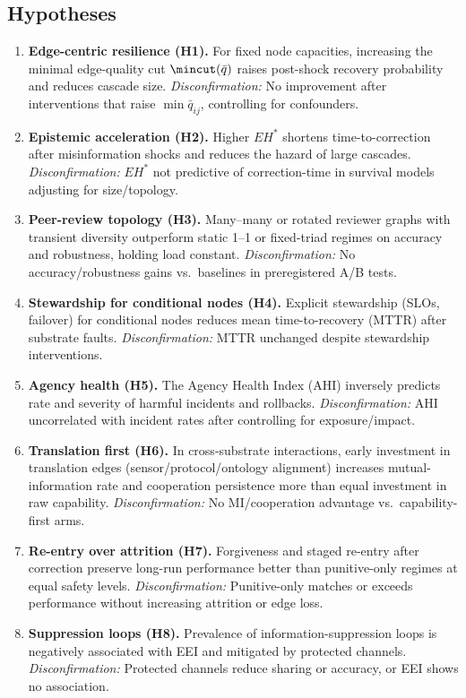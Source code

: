 \documentclass[12pt]{article}
\begin{document}
\subsection{Hypotheses}
\begin{enumerate}[leftmargin=1.2em]
\item \textbf{Edge-centric resilience (H1).} For fixed node capacities, increasing the minimal edge-quality cut $\mincut(\bar{q})$ raises post-shock recovery probability and reduces cascade size. \emph{Disconfirmation:} No improvement after interventions that raise $\min\bar{q}_{ij}$, controlling for confounders.
\item \textbf{Epistemic acceleration (H2).} Higher $EH^{\ast}$ shortens time-to-correction after misinformation shocks and reduces the hazard of large cascades. \emph{Disconfirmation:} $EH^{\ast}$ not predictive of correction-time in survival models adjusting for size/topology.
\item \textbf{Peer-review topology (H3).} Many--many or rotated reviewer graphs with transient diversity outperform static 1--1 or fixed-triad regimes on accuracy and robustness, holding load constant. \emph{Disconfirmation:} No accuracy/robustness gains vs.\ baselines in preregistered A/B tests.
\item \textbf{Stewardship for conditional nodes (H4).} Explicit stewardship (SLOs, failover) for conditional nodes reduces mean time-to-recovery (MTTR) after substrate faults. \emph{Disconfirmation:} MTTR unchanged despite stewardship interventions.
\item \textbf{Agency health (H5).} The Agency Health Index (AHI) inversely predicts rate and severity of harmful incidents and rollbacks. \emph{Disconfirmation:} AHI uncorrelated with incident rates after controlling for exposure/impact.
\item \textbf{Translation first (H6).} In cross-substrate interactions, early investment in translation edges (sensor/protocol/ontology alignment) increases mutual-information rate and cooperation persistence more than equal investment in raw capability. \emph{Disconfirmation:} No MI/cooperation advantage vs.\ capability-first arms.
\item \textbf{Re-entry over attrition (H7).} Forgiveness and staged re-entry after correction preserve long-run performance better than punitive-only regimes at equal safety levels. \emph{Disconfirmation:} Punitive-only matches or exceeds performance without increasing attrition or edge loss.
\item \textbf{Suppression loops (H8).} Prevalence of information-suppression loops is negatively associated with EEI and mitigated by protected channels. \emph{Disconfirmation:} Protected channels reduce sharing or accuracy, or EEI shows no association.
\end{enumerate}
\end{document}
